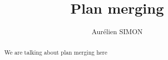 \documentclass{article}
\theoremstyle{definition}
\begin{document}
\title{Plan merging}

\author{Aurélien SIMON}

\maketitle

\begin{abstract}
We are talking about plan merging here
\end{abstract}


\newpage


\end{document}
